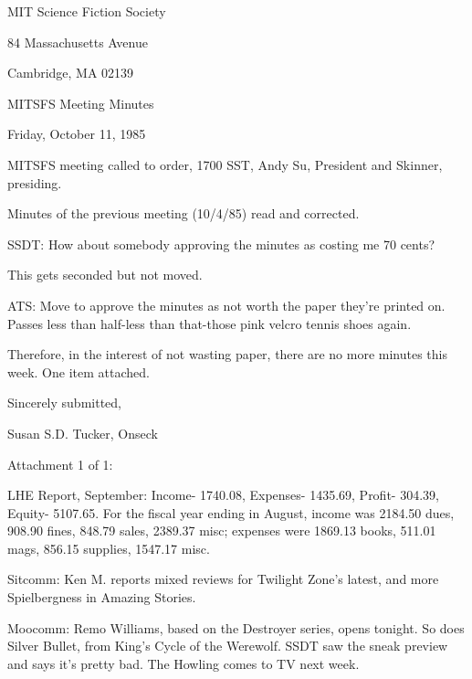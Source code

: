 \documentclass[12pt]{article}
\begin{document}
\begin{center}

MIT Science Fiction Society 

84 Massachusetts Avenue

Cambridge, MA 02139

\vspace{12pt}

MITSFS Meeting Minutes 

Friday, October 11, 1985

\end{center}
 
\vspace{18pt}

\setlength{\parskip}{6pt}

\noindent
MITSFS meeting called to order, 1700 SST,
Andy Su, President and Skinner, presiding.

Minutes of the previous meeting (10/4/85) read and corrected.

SSDT: How about somebody approving the minutes as costing me 70 cents?

This gets seconded but not moved.

ATS: Move to approve the minutes as not worth the paper they're printed on. Passes less than half-less than that-those pink velcro tennis shoes again.

Therefore, in the interest of not wasting paper, there are no more minutes this week. One item attached.

\vspace{18pt}

\centerline{Sincerely submitted,}
\centerline{Susan S.D. Tucker, Onseck}

\vspace{18pt}

Attachment 1 of 1:

LHE Report, September: Income- 1740.08, Expenses- 1435.69, Profit- 304.39, Equity- 5107.65. For the fiscal year ending in August, income was 2184.50 dues, 908.90 fines, 848.79 sales, 2389.37 misc; expenses were 1869.13 books, 511.01 mags, 856.15 supplies, 1547.17 misc.

Sitcomm: Ken M. reports mixed reviews for Twilight Zone's latest, and more Spielbergness in Amazing Stories.

Moocomm: Remo Williams, based on the Destroyer series, opens tonight. So does Silver Bullet, from King's Cycle of the Werewolf. SSDT saw the sneak preview and says it's pretty bad. The Howling comes to TV next week.
\end{document}
